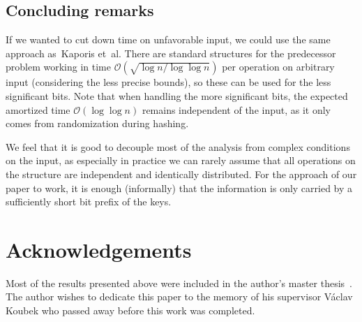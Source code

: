 \documentclass[
submission
]{dmtcs-episciences}
\theoremstyle{plain}
\theoremstyle{definition}
\theoremstyle{remark}
\theoremstyle{plain}
\theoremstyle{plain}
\def\OO{\mathcal O}
\begin{document}

\subsection{Concluding remarks}

If we wanted to cut down time on unfavorable input, we could use the
same approach as~Kaporis et~al. There are standard structures for
the predecessor problem working in time $\OO(\!\sqrt{\log n/\log\log n})$
per operation on arbitrary input (considering the less precise bounds),
so these can be used for the less significant bits. Note that when
handling the more significant bits, the expected amortized time $\OO\left(\log\log n\right)$
remains independent of the input, as it only comes from randomization
during hashing.

We feel that it is good to decouple most of the analysis from complex
conditions on the input, as especially in practice we can rarely assume
that all operations on the structure are independent and identically
distributed. For the approach of our paper to work, it is enough (informally)
that the information is only carried by a sufficiently short bit prefix
of the keys.

\section*{Acknowledgements}

Most of the results presented above were included in the author's master thesis~\cite{Cunat10}. The author wishes to dedicate this paper to the memory of his supervisor V\'aclav Koubek who passed away before this work was completed.



\end{document}
